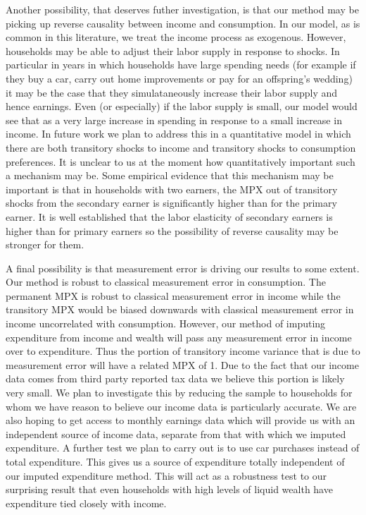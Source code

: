\documentclass[titlepage]{\econtex}\newcommand{\texname}{IncomeUncertainty}
\begin{document}
Another possibility, that deserves futher investigation, is that our method may be picking up reverse causality between income and consumption. In our model, as is common in this literature, we treat the income process as exogenous. However, households may be able to adjust their labor supply in response to shocks. In particular in years in which households have large spending needs (for example if they buy a car, carry out home improvements or pay for an offspring's wedding) it may be the case that they simulataneously increase their labor supply and hence earnings. Even (or especially) if the labor supply is small, our model would see that as a very large increase in spending in response to a small increase in income. In future work we plan to address this in a quantitative model in which there are both transitory shocks to income and transitory shocks to consumption preferences. It is unclear to us at the moment how quantitatively important such a mechanism may be. Some empirical evidence that this mechanism may be important is that in households with two earners, the MPX out of transitory shocks from the secondary earner is significantly higher than for the primary earner. It is well established that the labor elasticity of secondary earners is higher than for primary earners so the possibility of reverse causality may be stronger for them.

A final possibility is that measurement error is driving our results to some extent. Our method is robust to classical measurement error in consumption. The permanent MPX is robust to classical measurement error in income while the transitory MPX would be biased downwards with classical measurement error in income uncorrelated with consumption. However, our method of imputing expenditure from income and wealth will pass any measurement error in income over to expenditure. Thus the portion of transitory income variance that is due to measurement error will have a related MPX of 1. Due to the fact that our income data comes from third party reported tax data we believe this portion is likely very small. We plan to investigate this by reducing the sample to households for whom we have reason to believe our income data is particularly accurate. We are also hoping to get access to monthly earnings data which will provide us with an independent source of income data, separate from that with which we imputed expenditure. A further test we plan to carry out is to use car purchases instead of total expenditure. This gives us a source of expenditure totally independent of our imputed expenditure method. This will act as a robustness test to our surprising result that even households with high levels of liquid wealth have expenditure tied closely with income.
\end{document}
